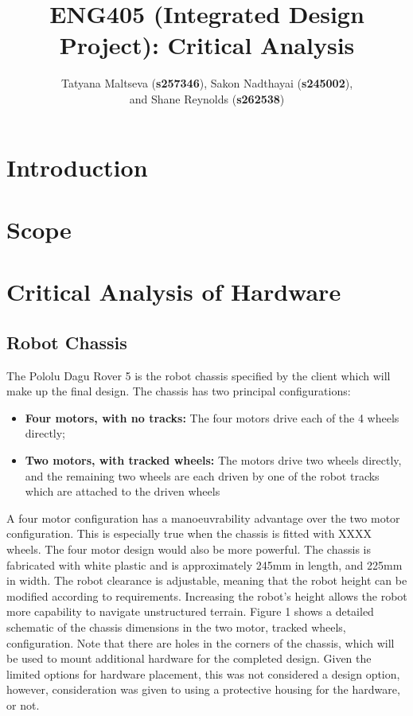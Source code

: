 \documentclass[a4paper]{article}
\begin{document}
\title{ENG405 (Integrated Design Project): Critical Analysis}
\author{Tatyana Maltseva (\textbf{s257346}), Sakon Nadthayai (\textbf{s245002}),\\ and Shane Reynolds (\textbf{s262538})}
\maketitle

\tableofcontents

\newpage

\section{Introduction}

\section{Scope}

\section{Critical Analysis of Hardware}

\subsection{Robot Chassis}
The Pololu Dagu Rover 5 is the robot chassis specified by the client which will make up the final design. The chassis has two principal configurations:
\begin{itemize}
\item \textbf{Four motors, with no tracks:} The four motors drive each of the 4 wheels directly;
\item \textbf{Two motors, with tracked wheels:} The motors drive two wheels directly, and the remaining two wheels are each driven by one of the robot tracks which are attached to the driven wheels
\end{itemize}

A four motor configuration has a manoeuvrability advantage over the two motor configuration. This is especially true when the chassis is fitted with XXXX wheels. The four motor design would also be more powerful. The chassis is fabricated with white plastic and is approximately 245$\si{\milli\meter}$ in length, and 225$\si{\milli\meter}$ in width. The robot clearance is adjustable, meaning that the robot height can be modified according to requirements. Increasing the robot's height allows the robot more capability to navigate unstructured terrain. Figure 1 shows a detailed schematic of the chassis dimensions in the two motor, tracked wheels, configuration. Note that there are holes in the corners of the chassis, which will be used to mount additional hardware for the completed design. Given the limited options for hardware placement, this was not considered a design option, however, consideration was given to using a protective housing for the hardware, or not.  
\end{document}
